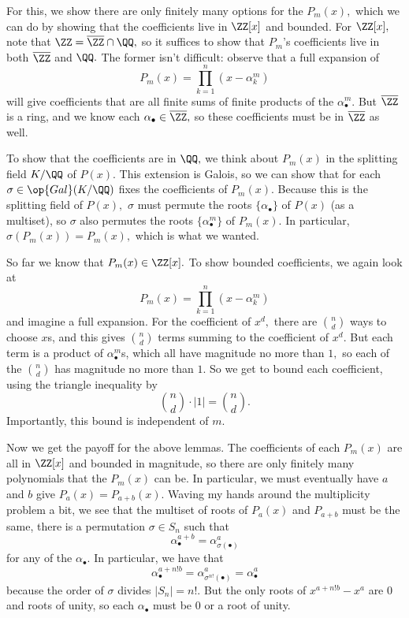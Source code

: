 For this, we show there are only finitely many options for the $P_m(x),$ which we can do by showing that the coefficients live in $\ZZ[x]$ and bounded. For $\ZZ[x],$ note that $\ZZ=\overline\ZZ\cap\QQ,$ so it suffices to show that $P_m$'s coefficients live in both $\overline\ZZ$ and $\QQ.$ The former isn't difficult: observe that a full expansion of
\[P_m(x)=\prod_{k=1}^n\left(x-\alpha_k^m\right)\]
will give coefficients that are all finite sums of finite products of the $\alpha_\bullet^m.$ But $\overline\ZZ$ is a ring, and we know each $\alpha_\bullet\in\overline\ZZ,$ so these coefficients must be in $\overline\ZZ$ as well.

To show that the coefficients are in $\QQ,$ we think about $P_m(x)$ in the splitting field $K/\QQ$ of $P(x).$ This extension is Galois, so we can show that for each $\sigma\in\op{Gal}(K/\QQ)$ fixes the coefficients of $P_m(x).$ Because this is the splitting field of $P(x),$ $\sigma$ must permute the roots $\{\alpha_\bullet\}$ of $P(x)$ (as a multiset), so $\sigma$ also permutes the roots $\{\alpha_\bullet^m\}$ of $P_m(x).$ In particular, $\sigma(P_m(x))=P_m(x),$ which is what we wanted.

So far we know that $P_m(x)\in\ZZ[x].$ To show bounded coefficients, we again look at
\[P_m(x)=\prod_{k=1}^n\left(x-\alpha_k^m\right)\]
and imagine a full expansion. For the coefficient of $x^d,$ there are $\binom nd$ ways to choose $x$s, and this gives $\binom nd$ terms summing to the coefficient of $x^d.$ But each term is a product of $\alpha_\bullet^m$s, which all have magnitude no more than $1,$ so each of the $\binom nd$ has magnitude no more than $1.$ So we get to bound each coefficient, using the triangle inequality by
\[\binom nd\cdot|1|=\binom nd.\]
Importantly, this bound is independent of $m.$

Now we get the payoff for the above lemmas. The coefficients of each $P_m(x)$ are all in $\ZZ[x]$ and bounded in magnitude, so there are only finitely many polynomials that the $P_m(x)$ can be. In particular, we must eventually have $a$ and $b$ give $P_a(x)=P_{a+b}(x).$ Waving my hands around the multiplicity problem a bit, we see that the multiset of roots of $P_a(x)$ and $P_{a+b}$ must be the same, there is a permutation $\sigma\in S_n$ such that
\[\alpha_\bullet^{a+b}=\alpha_{\sigma(\bullet)}^a\]
for any of the $\alpha_\bullet.$ In particular, we have that
\[\alpha_\bullet^{a+n!b}=\alpha_{\sigma^{n!}(\bullet)}^a=\alpha_\bullet^a\]
because the order of $\sigma$ divides $|S_n|=n!.$ But the only roots of $x^{a+n!b}-x^a$ are $0$ and roots of unity, so each $\alpha_\bullet$ must be $0$ or a root of unity.

